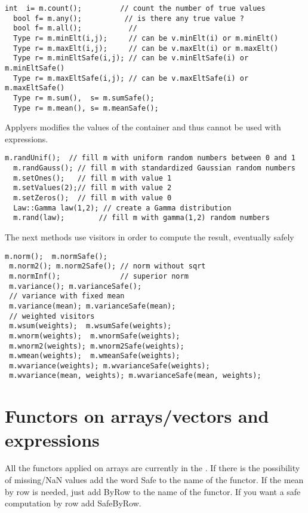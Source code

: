 \documentclass[a4paper,10pt]{article}
\begin{document}
\begin{lstlisting}[style=customcpp,caption=Visitors]
  int  i= m.count();         // count the number of true values
  bool f= m.any();          // is there any true value ?
  bool f= m.all();           //
  Type r= m.minElt(i,j);     // can be v.minElt(i) or m.minElt()
  Type r= m.maxElt(i,j);     // can be v.maxElt(i) or m.maxElt()
  Type r= m.minEltSafe(i,j); // can be v.minEltSafe(i) or m.minEltSafe()
  Type r= m.maxEltSafe(i,j); // can be v.maxEltSafe(i) or m.maxEltSafe()
  Type r= m.sum(),  s= m.sumSafe();
  Type r= m.mean(), s= m.meanSafe();
\end{lstlisting}

Applyers modifies the values of the container and thus cannot be used with
expressions.
\begin{lstlisting}[style=customcpp,caption=Appliers]
  m.randUnif();  // fill m with uniform random numbers between 0 and 1
  m.randGauss(); // fill m with standardized Gaussian random numbers
  m.setOnes();   // fill m with value 1
  m.setValues(2);// fill m with value 2
  m.setZeros();  // fill m with value 0
  Law::Gamma law(1,2); // create a Gamma distribution
  m.rand(law);        // fill m with gamma(1,2) random numbers
\end{lstlisting}

The next methods use visitors in order to compute the result, eventually safely
\begin{lstlisting}[style=customcpp]
 m.norm();  m.normSafe();
 m.norm2(); m.norm2Safe(); // norm without sqrt
 m.normInf();              // superior norm
 m.variance(); m.varianceSafe();
 // variance with fixed mean
 m.variance(mean); m.varianceSafe(mean);
 // weighted visitors
 m.wsum(weights);  m.wsumSafe(weights);
 m.wnorm(weights);  m.wnormSafe(weights);
 m.wnorm2(weights); m.wnorm2Safe(weights);
 m.wmean(weights);  m.wmeanSafe(weights);
 m.wvariance(weights); m.wvarianceSafe(weights);
 m.wvariance(mean, weights); m.wvarianceSafe(mean, weights);
\end{lstlisting}

\section{Functors on arrays/vectors and expressions}

All the functors applied on arrays are currently in the .
If there is the possibility of missing/NaN values add the word
Safe to the name of the functor. If the mean by row is needed, just add ByRow
to the name of the functor. If you want a safe computation by row add SafeByRow.
\end{document}
